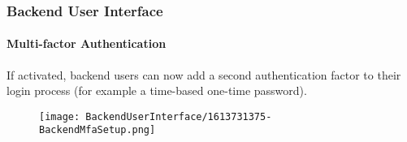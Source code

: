 %

\begin{frame}[fragile]
	\frametitle{Backend User Interface}
	\framesubtitle{Multi-factor Authentication}

	If activated, backend users can now add a second authentication factor to
	their login process (for example a time-based one-time password).

	\begin{figure}
		\texttt{[image: BackendUserInterface/1613731375-BackendMfaSetup.png]}
	\end{figure}

\end{frame}

